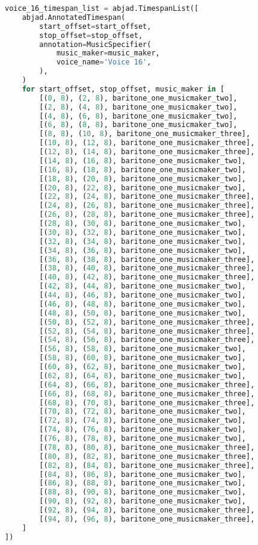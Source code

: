 \begin{lstlisting}[language=Python, caption=Invocation Source Code]
voice_16_timespan_list = abjad.TimespanList([
    abjad.AnnotatedTimespan(
        start_offset=start_offset,
        stop_offset=stop_offset,
        annotation=MusicSpecifier(
            music_maker=music_maker,
            voice_name='Voice 16',
        ),
    )
    for start_offset, stop_offset, music_maker in [
        [(0, 8), (2, 8), baritone_one_musicmaker_two],
        [(2, 8), (4, 8), baritone_one_musicmaker_two],
        [(4, 8), (6, 8), baritone_one_musicmaker_two],
        [(6, 8), (8, 8), baritone_one_musicmaker_two],
        [(8, 8), (10, 8), baritone_one_musicmaker_three],
        [(10, 8), (12, 8), baritone_one_musicmaker_three],
        [(12, 8), (14, 8), baritone_one_musicmaker_three],
        [(14, 8), (16, 8), baritone_one_musicmaker_two],
        [(16, 8), (18, 8), baritone_one_musicmaker_two],
        [(18, 8), (20, 8), baritone_one_musicmaker_two],
        [(20, 8), (22, 8), baritone_one_musicmaker_two],
        [(22, 8), (24, 8), baritone_one_musicmaker_three],
        [(24, 8), (26, 8), baritone_one_musicmaker_three],
        [(26, 8), (28, 8), baritone_one_musicmaker_three],
        [(28, 8), (30, 8), baritone_one_musicmaker_two],
        [(30, 8), (32, 8), baritone_one_musicmaker_two],
        [(32, 8), (34, 8), baritone_one_musicmaker_two],
        [(34, 8), (36, 8), baritone_one_musicmaker_two],
        [(36, 8), (38, 8), baritone_one_musicmaker_three],
        [(38, 8), (40, 8), baritone_one_musicmaker_three],
        [(40, 8), (42, 8), baritone_one_musicmaker_three],
        [(42, 8), (44, 8), baritone_one_musicmaker_two],
        [(44, 8), (46, 8), baritone_one_musicmaker_two],
        [(46, 8), (48, 8), baritone_one_musicmaker_two],
        [(48, 8), (50, 8), baritone_one_musicmaker_two],
        [(50, 8), (52, 8), baritone_one_musicmaker_three],
        [(52, 8), (54, 8), baritone_one_musicmaker_three],
        [(54, 8), (56, 8), baritone_one_musicmaker_three],
        [(56, 8), (58, 8), baritone_one_musicmaker_two],
        [(58, 8), (60, 8), baritone_one_musicmaker_two],
        [(60, 8), (62, 8), baritone_one_musicmaker_two],
        [(62, 8), (64, 8), baritone_one_musicmaker_two],
        [(64, 8), (66, 8), baritone_one_musicmaker_three],
        [(66, 8), (68, 8), baritone_one_musicmaker_three],
        [(68, 8), (70, 8), baritone_one_musicmaker_three],
        [(70, 8), (72, 8), baritone_one_musicmaker_two],
        [(72, 8), (74, 8), baritone_one_musicmaker_two],
        [(74, 8), (76, 8), baritone_one_musicmaker_two],
        [(76, 8), (78, 8), baritone_one_musicmaker_two],
        [(78, 8), (80, 8), baritone_one_musicmaker_three],
        [(80, 8), (82, 8), baritone_one_musicmaker_three],
        [(82, 8), (84, 8), baritone_one_musicmaker_three],
        [(84, 8), (86, 8), baritone_one_musicmaker_two],
        [(86, 8), (88, 8), baritone_one_musicmaker_two],
        [(88, 8), (90, 8), baritone_one_musicmaker_two],
        [(90, 8), (92, 8), baritone_one_musicmaker_two],
        [(92, 8), (94, 8), baritone_one_musicmaker_three],
        [(94, 8), (96, 8), baritone_one_musicmaker_three],
    ]
])


\end{lstlisting}
